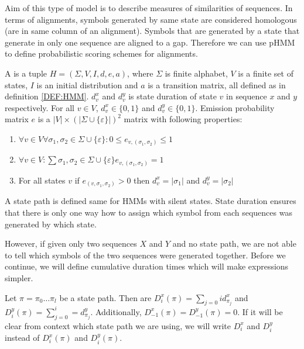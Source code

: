 Aim of this type of model is to describe measures of similarities of sequences.
In terms of alignments, symbols generated by same state are considered
homologous (are in same column of an alignment). Symbols that are generated by a
state that generate in only one sequence are aligned to a gap. Therefore we can
use pHMM to define probabilistic scoring schemes for alignments.


\begin{definition}
A  is a tuple $H=(\Sigma,V,I,d,e,a)$, where $\Sigma$ is finite
alphabet, $V$ is a finite set of states, $I$ is an initial distribution and $a$ is
a transition matrix, all defined as
in definition \ref{DEF:HMM}. $d^x_v$ and $d^y_v$ is state duration of state $v$
in sequence $x$ and $y$ respectively. For all $v\in V$,
$d^x_v\in \{0,1\}$ and $d^y_v\in \{0,1\}$.
Emission probability matrix $e$ is
a $|V|\times\left(|\Sigma\cup\{\varepsilon\}|\right)^2$ matrix with following
properties:
\begin{enumerate}
\item
$\forall v\in V\forall \sigma_1,\sigma_2\in\Sigma\cup\{\varepsilon\}:
0\leq e_{v,(\sigma_1,\sigma_2)}\leq 1$

\item 
$\forall v\in V:
\sum {\sigma_1,\sigma_2\in\Sigma\cup\{\varepsilon\}}e_{v,(\sigma_1,\sigma_2)} = 1$

\item For all states $v$ if $e_{(v,\sigma_1,\sigma_2)}>0$ then
$d^x_v=|\sigma_1|$ and $d^y_v=|\sigma_2|$
\end{enumerate}

\end{definition}

A state path is defined same for HMMs with silent states. State duration
ensures
that there is only one way how to assign which symbol from each sequences was
generated by which state. 

However, if given only two sequences $X$ and $Y$ and no state path, we are not
able to tell which symbols of the two sequences were generated together. Before
we continue, we will define cumulative duration times which will make
expressions simpler.

\begin{definition}
Let $\pi=\pi_0\dots\pi_l$ be a state path. Then  are
$D^x_i(\pi)=\sum_{j=0}{i}d^x_{\pi_j}$ and $D^y_i(\pi)=\sum_{j=0}^{i}=d^y_{\pi_j}$.
Additionally, $D^x_{-1}(\pi)=D^y_{-1}(\pi)=0$. If it will be clear from context
which state path we are using, we will write $D^x_i$ and $D^y_i$ instead of
$D^x_i(\pi)$ and $D^y_i(\pi)$.
\end{definition}

